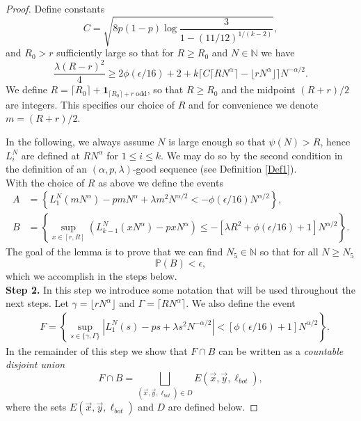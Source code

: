\begin{proof}
	Define constants
	\begin{equation}\label{21Cdef}
		C = \sqrt{ 8p(1-p) \log\frac{3}{1-(11/12)^{1/(k-2)}}},
	\end{equation}
	and $R_0 > r$ sufficiently large so that for $R \geq R_0$ and $N \in \mathbb{N}$ we have
	\begin{equation}\label{21Rdef2}
		\frac{\lambda(R-r)^2}{4} \geq  2\phi(\epsilon/16) + 2 + k \lceil C  \lceil RN^{\alpha} \rceil -  \lfloor rN^{\alpha} \rfloor \rceil N^{-\alpha/2}.
	\end{equation}
	We define $R = \lceil R_0\rceil + \mathbf{1}_{\lceil R_0\rceil + r\;\mathrm{odd}}$, so that $R\geq R_0$ and the midpoint $(R+r)/2$ are integers. This specifies our choice of $R$ and for convenience we denote $m = (R+r)/2$. 
	
	In the following, we always assume $N$ is large enough so that $\psi(N) > R$, hence $L_i^N$ are defined at $RN^\alpha$ for $1\leq i\leq k$. We may do so by the second condition in the definition of an $(\alpha,p,\lambda)$-good sequence (see Definition \ref{Def1}). \\
	
	With the choice of $R$ as above we define the events
	\begin{equation}\label{21AB}
		\begin{split}
			A &= \left\{L_1^N\left(mN^{\alpha}\right) - pm N^\alpha  + \lambda m^2 N^{\alpha/2} < -\phi(\epsilon/16)N^{\alpha/2}\right\},\\
			B &= \left\{\sup_{x\in[r,R]} \left(L_{k-1}^N(xN^\alpha) - pxN^\alpha\right) \leq -[\lambda R^2 + \phi(\epsilon/16) + 1] N^{\alpha/2} \right\}.
		\end{split}
	\end{equation}
	The goal of the lemma is to prove that we can find $N_5\in\mathbb{N}$ so that for all $N\geq N_5$
	\begin{equation}\label{21Bbound}
		\mathbb{P}(B) < \epsilon,
	\end{equation}
	which we accomplish in the steps below.\\
	
	\noindent\textbf{Step 2.} In this step we introduce some notation that will be used throughout the next steps. Let $\gamma = \lfloor rN^{\alpha} \rfloor$ and $\Gamma = \lceil RN^{\alpha} \rceil$. We also define the event
	\begin{equation}\label{21x1y1}
		\begin{split}
			& F = \left\{ \sup_{s \in \{\gamma,  \Gamma\}} \left|L_1^N(s) - ps + \lambda s^2N^{-\alpha/2}\right|< [\phi(\epsilon/16) + 1] N^{\alpha/2} \right\}.
		\end{split}
	\end{equation}
	In the remainder of this step we show that $F \cap B$ can be written as a \textit{countable disjoint union}
	\begin{equation}\label{21F}
		F \cap B = \bigsqcup_{(\vec{x},\vec{y},\ell_{bot})\in D}  E(\vec{x},\vec{y},\ell_{bot}),
	\end{equation} 
	where the sets $E(\vec{x},\vec{y},\ell_{bot})$ and $D$ are defined below.
	

\end{proof}

